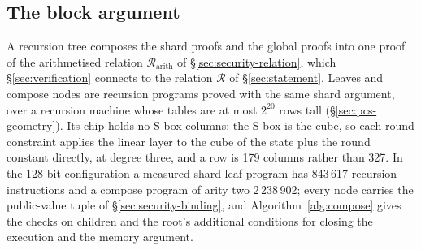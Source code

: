 \subsection{The block argument}
\label{sec:arch-recursion}
\label{sec:argument-block}

A recursion tree composes the shard proofs and the global proofs into one proof of the arithmetised relation $\mathcal R_{\mathrm{arith}}$ of \S\ref{sec:security-relation}, which \S\ref{sec:verification} connects to the relation $\mathcal R$ of \S\ref{sec:statement}. Leaves and compose nodes are recursion programs proved with the same shard argument, over a recursion machine whose tables are at most $2^{20}$ rows tall (\S\ref{sec:pcs-geometry}). Its \Poseidon{} chip holds no S-box columns: the S-box is the cube, so each round constraint applies the linear layer to the cube of the state plus the round constant directly, at degree three, and a row is 179 columns rather than 327. In the 128-bit configuration a measured shard leaf program has 843\,617 recursion instructions and a compose program of arity two 2\,238\,902; every node carries the public-value tuple of \S\ref{sec:security-binding}, and Algorithm~\ref{alg:compose} gives the checks on children and the root's additional conditions for closing the execution and the memory argument.


